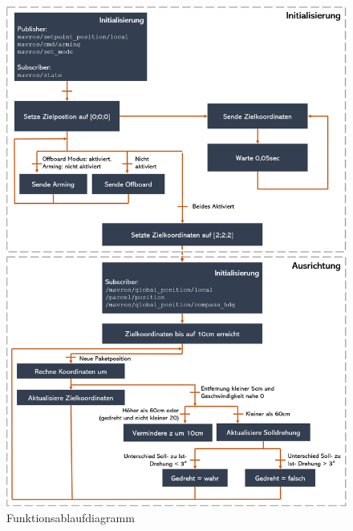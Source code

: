 \begin{figure}[h]
	\centering
	\includegraphics[scale=0.5]{"Grafiken/Prozellablauf.png"}
	\caption{Funktionsablaufdiagramm}
	\label{fig:meine-grafik}
\end{figure}